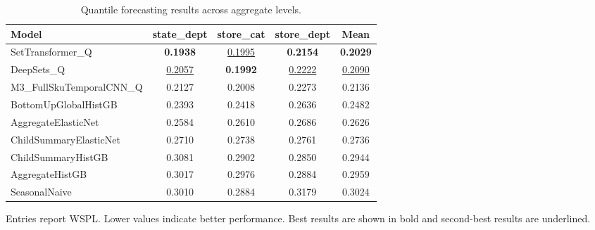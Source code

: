 \begin{table}[H]
\centering
\caption{Quantile forecasting results across aggregate levels.}
\label{tab:main_quantile}
\begin{threeparttable}
\begin{tabular}{lcccc}
\toprule
Model & state\_dept & store\_cat & store\_dept & Mean \\
\midrule
SetTransformer\_Q & \textbf{0.1938} & \underline{0.1995} & \textbf{0.2154} & \textbf{0.2029} \\
DeepSets\_Q & \underline{0.2057} & \textbf{0.1992} & \underline{0.2222} & \underline{0.2090} \\
M3\_FullSkuTemporalCNN\_Q & 0.2127 & 0.2008 & 0.2273 & 0.2136 \\
BottomUpGlobalHistGB & 0.2393 & 0.2418 & 0.2636 & 0.2482 \\
AggregateElasticNet & 0.2584 & 0.2610 & 0.2686 & 0.2626 \\
ChildSummaryElasticNet & 0.2710 & 0.2738 & 0.2761 & 0.2736 \\
ChildSummaryHistGB & 0.3081 & 0.2902 & 0.2850 & 0.2944 \\
AggregateHistGB & 0.3017 & 0.2976 & 0.2884 & 0.2959 \\
SeasonalNaive & 0.3010 & 0.2884 & 0.3179 & 0.3024 \\
\bottomrule
\end{tabular}
\begin{tablenotes}
\footnotesize \item Entries report WSPL. Lower values indicate better performance. Best results are shown in bold and second-best results are underlined.
\end{tablenotes}
\end{threeparttable}
\end{table}
